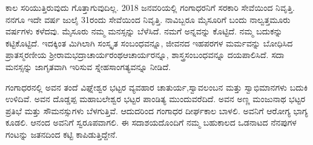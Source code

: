 {ಕಾಲ ಸರಿಯುತ್ತಿರುವುದು  ಗೊತ್ತಾಗುವುದಿಲ್ಲ. 2018 ಜನವರಿಯಲ್ಲಿ \hbox{ಗಂಗಾಧರನಿಗೆ} ಸರಕಾರಿ ಸೇವೆಯಿಂದ ನಿವೃತ್ತಿ. ನನಗೂ ಇದೇ ವರ್ಷ ಜುಲೈ 31ರಂದು ಸೇವೆಯಿಂದ ನಿವೃತ್ತಿ. ನಾವಿಬ್ಬರೂ ಮೈಸೂರಿಗೆ ಬಂದು ನಾಲ್ವತ್ತಮೂರು ವರ್ಷಗಳು ಕಳೆದವು. ಮೈಸೂರು ನಮ್ಮ ಮನಸ್ಸನ್ನು ಬೆಳೆಸಿದೆ. ನಮಗೆ ಅನ್ನವನ್ನು ಕೊಟ್ಟಿದೆ. ನಮ್ಮ ಬದುಕನ್ನು ಕಟ್ಟಿಕೊಟ್ಟಿದೆ. ಇದಕ್ಕಿಂತ ಮಿಗಿಲಾಗಿ ಸಂಸ್ಕೃತ ಸಂಬಂಧವನ್ನೂ, ಜೀವನದ ಇಹ\enginline{-}ಪರಗಳ ಮರ್ಮವನ್ನು ಬೋಧಿಸಿದ ಪ್ರಾತಸ್ಮರಣೀಯ ಶ್ರೀರಾಮಭದ್ರಾಚಾರ್ಯರಂಥ\break ಆಚಾರ್ಯರನ್ನೂ, ಶಾಸ್ತ್ರಸಂಬಂಧವನ್ನೂ ದಯಪಾಲಿಸಿದೆ. ಸದಾ ಮನಸ್ಸನ್ನು ಜಾಗೃತವಾಗಿ ಇರಿಸುವ ಸ್ನೇಹ\enginline{-}ಸಾಂಗತ್ಯವನ್ನೂ ನೀಡಿದೆ. 

ಗಂಗಾಧರನಲ್ಲಿ ಅವನ ತಂದೆ ವಿಘ್ನೇಶ್ವರ ಭಟ್ಟರ ವ್ಯವಹಾರ ಚಾತುರ್ಯ,\break ಸ್ವಾವಲಂಬನ ಮತ್ತು ಸ್ವಾಭಿಮಾನಗಳು ಬದುಕಿ ಉಳಿದಿವೆ. ಅವನ ದೊಡ್ಡಪ್ಪ  ಮಹಾ\-ಬಲೇಶ್ವರ ಭಟ್ಟರ ಪಾಂಡಿತ್ಯ ಮುಂದುವರೆದಿದೆ.  ಅವನ ಅಣ್ಣ ಮಂಜುನಾಥ ಭಟ್ಟರ ಪ್ರತಿಭೆ ಮತ್ತು ಸೌಮನಸ್ಸುಗಳು ಬೆಳಗುತ್ತಿವೆ. ಆದುದರಿಂದ ಗಂಗಾಧರ ದೀರ್ಘಕಾಲ ಬಾಳಲಿ. ಅವನಿಗೆ ಆರೋಗ್ಯ ಭಾಗ್ಯ ಕೂಡಲಿ. ಆನಂದ ಅವನಿಗೆ ಸ್ವರೂಪವಾಗಲಿ. ಈ ಸದಾಶಯದೊಂದಿಗೆ ನಮ್ಮ ಬಹುಕಾಲದ ಒಡನಾಟದ ನೆನಪುಗಳ ಗಂಟನ್ನು ಜತನದಿಂದ ಕಟ್ಟಿ ಕಾಪಿಡುತ್ತಿದ್ದೇನೆ.

\articleend

}
